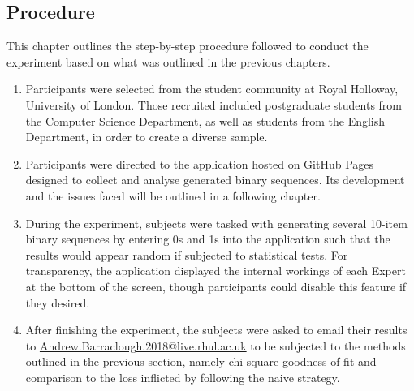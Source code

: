 \subsection{Procedure}\label{subsection:procedure}
This chapter outlines the step-by-step procedure followed to conduct the experiment based on what was outlined in the previous chapters.
\begin{enumerate}
    \item Participants were selected from the student community at Royal Holloway, University of London. Those recruited included postgraduate students from the Computer Science Department, as well as students from the English Department, in order to create a diverse sample.
    \item Participants were directed to the application hosted on \href{https://arbarraclough.github.io/aggregating_algorithm/}{GitHub Pages} designed to collect and analyse generated binary sequences. Its development and the issues faced will be outlined in a following chapter.
    \item During the experiment, subjects were tasked with generating several 10-item binary sequences by entering 0s and 1s into the application such that the results would appear random if subjected to statistical tests. For transparency, the application displayed the internal workings of each Expert at the bottom of the screen, though participants could disable this feature if they desired.
    \item After finishing the experiment, the subjects were asked to email their results to \href{mailto:Andrew.Barraclough.2018@live.rhul.ac.uk}{Andrew.Barraclough.2018@live.rhul.ac.uk} to be subjected to the methods outlined in the previous section, namely chi-square goodness-of-fit and comparison to the loss inflicted by following the naive strategy.
\end{enumerate}